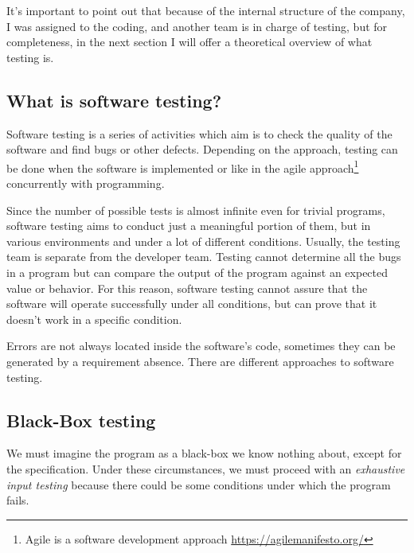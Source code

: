 It's important to point out that because of the internal structure of
the company, I was assigned to the coding, and another team is in
charge of testing, but for completeness, in the next section I will
offer a theoretical overview of what testing is.


\subsection{What is software testing?}
Software testing is a series of activities which aim is to check the
quality of the software and find bugs or other defects.  Depending on
the approach, testing can be done when the software is implemented or
like in the agile approach\footnote{Agile is a software development
  approach \url{https://agilemanifesto.org/}} concurrently with
programming.

Since the number of possible tests is almost infinite even for trivial
programs\cite{myers2011art}, software testing aims to conduct just a
meaningful portion of them, but in various environments and under a
lot of different conditions.  Usually, the testing team is separate
from the developer team.  Testing cannot determine all the bugs in a
program but can compare the output of the program against an expected
value or behavior.  For this reason, software testing cannot assure
that the software will operate successfully under all conditions, but
can prove that it doesn't work in a specific condition.

Errors are not always located inside the software's code, sometimes
they can be generated by a requirement absence.  There are different
approaches to software testing.

\subsection{Black-Box testing}
\label{sec:blackbox} 
We must imagine the program as a black-box we know nothing about, except for the specification.
Under these circumstances, we must proceed with an \textit{exhaustive input testing} because there could be some
conditions under which the program fails.

